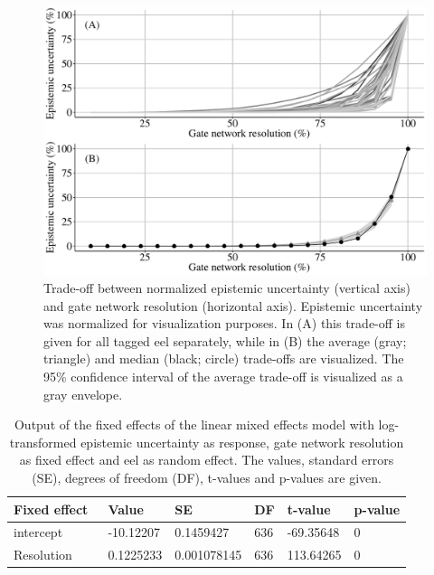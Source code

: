 \documentclass[preprint,12pt,authoryear]{elsarticle}
\begin{document}
\begin{spacing}{1.9}
\begin{figure}[h!]
  \centering\includegraphics[scale=0.4]{Pareto_combo_final_grey_jb.pdf}
  \caption{Trade-off between normalized epistemic uncertainty (vertical axis) and gate network resolution (horizontal axis). Epistemic uncertainty was normalized for visualization purposes. In (A) this trade-off is given for all tagged eel separately, while in (B) the average (gray; triangle) and median (black; circle) trade-offs are visualized. The 95\% confidence interval of the average trade-off is visualized as a gray envelope.}
  \label{fig:Pareto}
\end{figure}

\begin{table}[h!]
\centering
\scriptsize
\caption{Output of the fixed effects of the linear mixed effects model with log-transformed epistemic uncertainty as response, gate network resolution as fixed effect and eel as random effect. The values, standard errors (SE), degrees of freedom (DF), t-values and p-values are given.}
\begin{tabular}{|l|l|l|l|l|l|} 
\hline
Fixed effect~         & Value    & SE      & DF   & t-value & p-value            \\ 
\hline
intercept             & -10.12207 & 0.1459427 & 636 & -69.35648 &       0            \\ 
\hline
Resolution            & 0.1225233 & 0.001078145 & 636 & 113.64265 &      0  \\
\hline
\end{tabular}
\label{tab:Mixed_Model}
\end{table}


\end{spacing}
\end{document}
